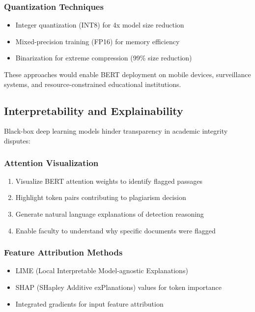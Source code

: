 \subsubsection{Quantization Techniques}

\begin{itemize}
  \item Integer quantization (INT8) for 4x model size reduction
  \item Mixed-precision training (FP16) for memory efficiency
  \item Binarization for extreme compression (99\% size reduction)
\end{itemize}

These approaches would enable BERT deployment on mobile devices, surveillance systems, and resource-constrained educational institutions.

\subsection{Interpretability and Explainability}

Black-box deep learning models hinder transparency in academic integrity disputes:

\subsubsection{Attention Visualization}

\begin{enumerate}
  \item Visualize BERT attention weights to identify flagged passages
  \item Highlight token pairs contributing to plagiarism decision
  \item Generate natural language explanations of detection reasoning
  \item Enable faculty to understand why specific documents were flagged
\end{enumerate}

\subsubsection{Feature Attribution Methods}

\begin{itemize}
  \item LIME (Local Interpretable Model-agnostic Explanations)
  \item SHAP (SHapley Additive exPlanations) values for token importance
  \item Integrated gradients for input feature attribution
\end{itemize}

